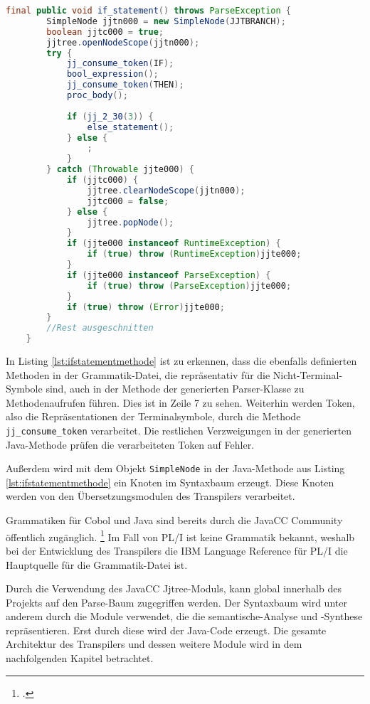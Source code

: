 \begin{lstlisting}[language=Java, caption=Syntaxregel für Verzweigungen als Java-Methode, label={lst:ifstatementmethode}]
	final public void if_statement() throws ParseException {
		SimpleNode jjtn000 = new SimpleNode(JJTBRANCH);
		boolean jjtc000 = true;
		jjtree.openNodeScope(jjtn000);
		try {
			jj_consume_token(IF);
			bool_expression();
			jj_consume_token(THEN);
			proc_body();
			
			if (jj_2_30(3)) {
				else_statement();
			} else {
				;
			}
		} catch (Throwable jjte000) {
			if (jjtc000) {
				jjtree.clearNodeScope(jjtn000);
				jjtc000 = false;
			} else {
				jjtree.popNode();
			}
			if (jjte000 instanceof RuntimeException) {
				if (true) throw (RuntimeException)jjte000;
			}
			if (jjte000 instanceof ParseException) {
				if (true) throw (ParseException)jjte000;
			}
			if (true) throw (Error)jjte000;
		}
		//Rest ausgeschnitten
	}	
\end{lstlisting}

In Listing \ref{lst:ifstatementmethode} ist zu erkennen, dass die ebenfalls definierten Methoden in der Grammatik-Datei, die repräsentativ für die Nicht-Terminal-Symbole sind, auch in der Methode der generierten Parser-Klasse zu Methodenaufrufen führen. Dies ist in Zeile 7 zu sehen. Weiterhin werden Token, also die Repräsentationen der Terminalsymbole, durch die Methode \verb+jj_consume_token+ verarbeitet. Die restlichen Verzweigungen in der generierten Java-Methode prüfen die verarbeiteten Token auf Fehler.

Außerdem wird mit dem Objekt \verb+SimpleNode+ in der Java-Methode aus Listing \ref{lst:ifstatementmethode} ein Knoten im Syntaxbaum erzeugt. Diese Knoten werden von den Übersetzungsmodulen des Transpilers verarbeitet.

Grammatiken für Cobol und Java sind bereits durch die JavaCC Community öffentlich zugänglich. \footcite[Vgl. ][]{javaccdoku}
Im Fall von PL/I ist keine Grammatik bekannt, weshalb bei der Entwicklung des Transpilers die IBM Language Reference für PL/I die Hauptquelle für die Grammatik-Datei ist.   

Durch die Verwendung des JavaCC Jjtree-Moduls, kann global innerhalb des Projekts auf den Parse-Baum zugegriffen werden. 
Der Syntaxbaum wird unter anderem durch die Module verwendet, die die semantische-Analyse und -Synthese repräsentieren.
Erst durch diese wird der Java-Code erzeugt.
Die gesamte Architektur des Transpilers und dessen weitere Module wird in dem nachfolgenden Kapitel betrachtet. 
\pagebreak
